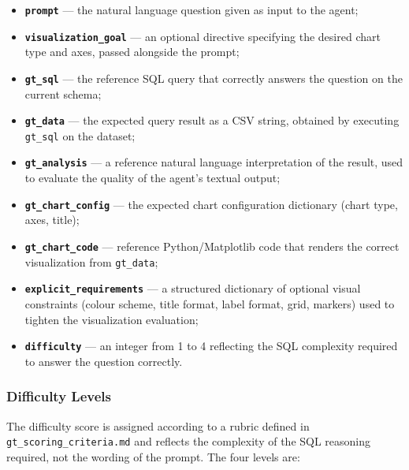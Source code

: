 \begin{itemize}
    \item \textbf{\texttt{prompt}} — the natural language question given as input
          to the agent;
    \item \textbf{\texttt{visualization\_goal}} — an optional directive specifying
          the desired chart type and axes, passed alongside the prompt;
    \item \textbf{\texttt{gt\_sql}} — the reference SQL query that correctly answers
          the question on the current schema;
    \item \textbf{\texttt{gt\_data}} — the expected query result as a CSV string,
          obtained by executing \texttt{gt\_sql} on the dataset;
    \item \textbf{\texttt{gt\_analysis}} — a reference natural language interpretation
          of the result, used to evaluate the quality of the agent's textual output;
    \item \textbf{\texttt{gt\_chart\_config}} — the expected chart configuration
          dictionary (chart type, axes, title);
    \item \textbf{\texttt{gt\_chart\_code}} — reference Python/Matplotlib code that
          renders the correct visualization from \texttt{gt\_data};
    \item \textbf{\texttt{explicit\_requirements}} — a structured dictionary of
          optional visual constraints (colour scheme, title format, label format,
          grid, markers) used to tighten the visualization evaluation;
    \item \textbf{\texttt{difficulty}} — an integer from 1 to 4 reflecting the SQL
          complexity required to answer the question correctly.
\end{itemize}

\subsubsection{Difficulty Levels}

The difficulty score is assigned according to a rubric defined in
\texttt{gt\_scoring\_criteria.md} and reflects the complexity of the SQL reasoning
required, not the wording of the prompt. The four levels are:

